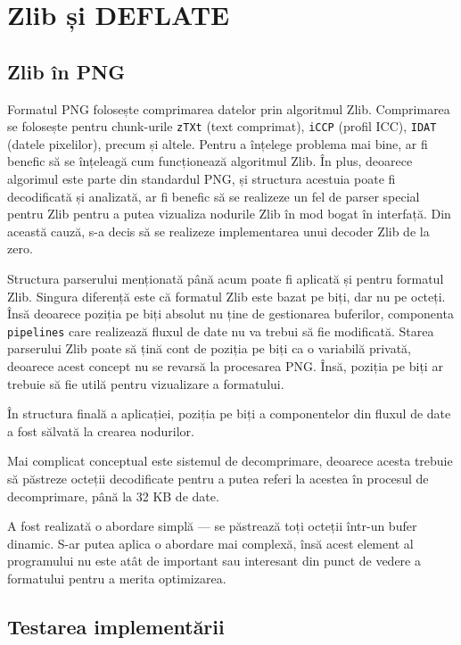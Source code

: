 \documentclass[a4paper,12pt]{report}
\begin{document}
\section{Zlib și DEFLATE}

\subsection{Zlib în \ac{PNG}}

Formatul \ac{PNG} folosește comprimarea datelor prin algoritmul Zlib.
Comprimarea se folosește pentru chunk-urile \texttt{zTXt} (text comprimat),
\texttt{iCCP} (profil \ac{ICC}), \texttt{IDAT} (datele pixelilor), precum și altele.
Pentru a înțelege problema mai bine, ar fi benefic să se înțeleagă cum funcționează algoritmul Zlib.
În plus, deoarece algorimul este parte din standardul \ac{PNG},
și structura acestuia poate fi decodificată și analizată,
ar fi benefic să se realizeze un fel de parser special pentru Zlib pentru a putea vizualiza nodurile Zlib
în mod bogat în interfață.
Din această cauză, s-a decis să se realizeze implementarea unui decoder Zlib de la zero.

Structura parserului menționată până acum poate fi aplicată și pentru formatul Zlib.
Singura diferență este că formatul Zlib este bazat pe biți, dar nu pe octeți.
Însă deoarece poziția pe biți absolut nu ține de gestionarea buferilor,
componenta \texttt{pipelines} care realizează fluxul de date nu va trebui să fie modificată.
Starea parserului Zlib poate să țină cont de poziția pe biți ca o variabilă privată, deoarece
acest concept nu se revarsă la procesarea \ac{PNG}.
Însă, poziția pe biți ar trebuie să fie utilă pentru vizualizare a formatului.

În structura finală a aplicației, poziția pe biți a componentelor din fluxul de date a fost sălvată la crearea nodurilor.

Mai complicat conceptual este sistemul de decomprimare,
deoarece acesta trebuie să păstreze octeții decodificate pentru a putea referi la acestea
în procesul de decomprimare, până la 32 KB de date.

A fost realizată o abordare simplă --- se păstrează toți octeții într-un bufer dinamic.
S-ar putea aplica o abordare mai complexă, însă acest element al programului
nu este atât de important sau interesant din punct de vedere a formatului pentru a merita optimizarea.

\subsection{Testarea implementării}
\end{document}
